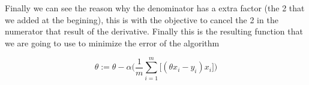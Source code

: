 \documentclass[12pt,journal]{IEEEtran}
\begin{document}
    Finally we can see the reason why the denominator has a extra factor
    (the 2 that we added at the begining), this is with the objective
    to cancel the 2 in the numerator that result of the derivative. Finally
    this is the resulting function that we are going to use to minimize the
    error of the algorithm

    \begin{equation}
        \theta := \theta - \alpha
            \Bigg(
                \frac{1}{m} \sum_{i=1}^{m}
                    \Big[
                        (\theta x_i - y_i) x_i
                    \Big]
            \Bigg)
    \end{equation}
\end{document}
